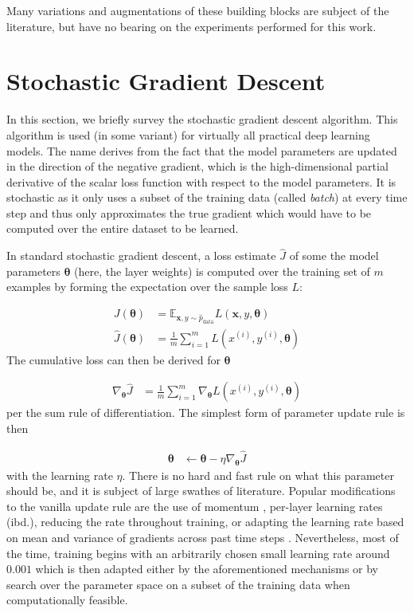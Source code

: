 Many variations and augmentations of these building blocks are subject of the
literature, but have no bearing on the experiments performed for this work.

\section{Stochastic Gradient Descent}%
\label{sec:review_stochastic_gradient_descent}

In this section, we briefly survey the stochastic gradient descent algorithm.
This algorithm is used (in some variant) for virtually all practical deep
learning models. The name derives from the fact that the model parameters are
updated in the direction of the negative gradient, which is the high-dimensional
partial derivative of the scalar loss function with respect to the model
parameters. It is stochastic as it only uses a subset of the training data
(called \emph{batch}) at every time step and thus only approximates the true
gradient which would have to be computed over the entire dataset to be learned.

In standard stochastic gradient descent, a loss estimate $\widehat{J}$ of some the
model parameters $\boldsymbol\theta$ (here, the layer weights) is computed over the training set of $m$
examples by forming the expectation over the sample loss $L$:

\begin{align}
J(\boldsymbol\theta) &= \mathbb{E}_{\mathbf{x},y\sim\hat{p}_{\text{data}}} L(\mathbf{x}, y, \boldsymbol\theta) \\
\widehat{J}(\boldsymbol\theta)                         &= \frac{1}{m}\sum_{i=1}^{m}L(x^{(i)}, y^{(i)}, \boldsymbol\theta)
\end{align}
The cumulative loss can then be derived for $\boldsymbol\theta$

\begin{align}
\nabla_{\boldsymbol\theta}\widehat{J} &= \frac{1}{m}\sum_{i=1}^{m}\nabla_{\boldsymbol\theta}L(x^{(i)}, y^{(i)}, \boldsymbol\theta)
\end{align}
per the sum rule of differentiation. The simplest form of parameter update rule
is then

\begin{align}
    \boldsymbol\theta &\leftarrow \boldsymbol\theta - \eta
\nabla_{\boldsymbol\theta}\widehat{J}
\end{align}
with the learning rate $\eta$. There is no hard and fast rule on what this
parameter should be, and it is subject of large swathes of literature. Popular
modifications to the vanilla update rule are the use of momentum
\citep{jacobs1988increased}, per-layer learning rates (ibd.), reducing the rate
throughout training, or adapting the
learning rate based on mean and variance of gradients across past time steps
\citep{kingma2014adam}. Nevertheless, most of the time, training begins with an
arbitrarily chosen small learning rate around $0.001$ which is then adapted
either by the aforementioned mechanisms or by search over the parameter space on
a subset of the training data when computationally feasible.


